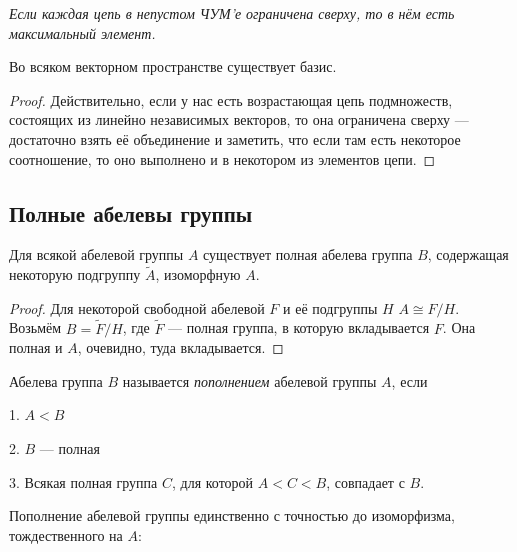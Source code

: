 \documentclass[10pt,a4paper]{article}%
\begin{document}
\vskip 2pt {\sl Если
каждая цепь в непустом ЧУМ'е ограничена сверху, то в нём есть
максимальный элемент.}

\begin{theorem}Во всяком векторном пространстве существует
базис.
\end{theorem}

\begin{proof} Действительно, если у нас есть возрастающая цепь
подмножеств, состоящих из линейно независимых векторов, то она
ограничена сверху --- достаточно взять её объединение и заметить,
что если там есть некоторое соотношение, то оно выполнено и в
некотором из элементов цепи.
\end{proof}

\subsection{Полные абелевы группы}

\begin{theorem}Для всякой
абелевой группы $A$ существует полная абелева группа $B$,
содержащая некоторую подгруппу $\widetilde{A}$, изоморфную $A$.
\end{theorem}

\begin{proof} Для некоторой свободной абелевой $F$ и её подгруппы $H$
$A\cong F/H$. Возьмём $B=\widetilde{F}/H$, где $\widetilde{F}$
--- полная группа, в которую вкладывается $F$. Она полная и $A$,
очевидно, туда вкладывается.\end{proof}

Абелева группа $B$ называется {\em пополнением} абелевой группы $A$, если
\par 1. $A<B$
\par 2. $B$ --- полная
\par 3. Всякая полная группа $C$, для которой $A<C<B$, совпадает с $B$.

\begin{theorem}
Пополнение абелевой группы единственно с точностью до изоморфизма,
тождественного на $A$:
\begin{figure}[h]
\hfil{}\hfil
\end{figure}\label{ab gr comp}
\end{theorem}
\end{document}
